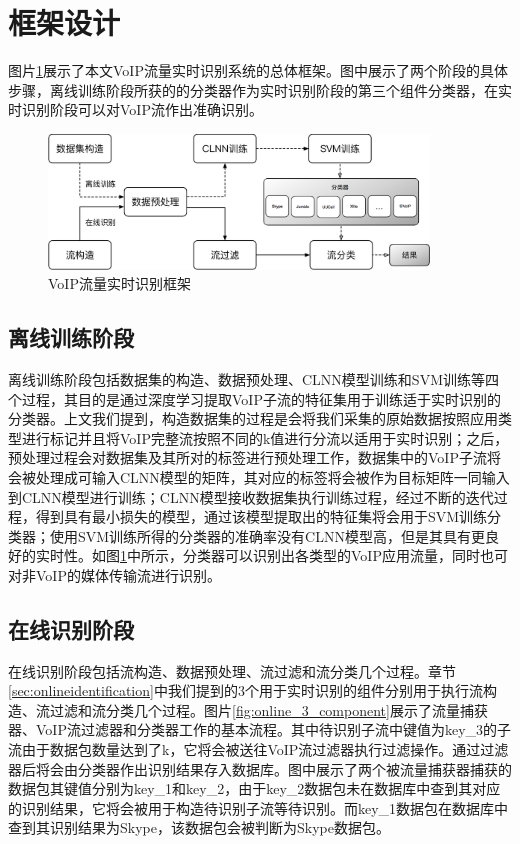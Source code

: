 \section{框架设计}
图片\ref{fig:architecture}展示了本文VoIP流量实时识别系统的总体框架。图中展示了两个阶段的具体步骤，离线训练阶段所获的的分类器作为实时识别阶段的第三个组件分类器，在实时识别阶段可以对VoIP流作出准确识别。
\begin{figure}[thb]
\centering
\includegraphics[width=0.9\textwidth]{figures/architecture.eps}
\caption{VoIP流量实时识别框架}
\label{fig:architecture}
\end{figure}

\subsection{离线训练阶段}
离线训练阶段包括数据集的构造、数据预处理、CLNN模型训练和SVM训练等四个过程，其目的是通过深度学习提取VoIP子流的特征集用于训练适于实时识别的分类器。上文我们提到，构造数据集的过程是会将我们采集的原始数据按照应用类型进行标记并且将VoIP完整流按照不同的k值进行分流以适用于实时识别；之后，预处理过程会对数据集及其所对的标签进行预处理工作，数据集中的VoIP子流将会被处理成可输入CLNN模型的矩阵，其对应的标签将会被作为目标矩阵一同输入到CLNN模型进行训练；CLNN模型接收数据集执行训练过程，经过不断的迭代过程，得到具有最小损失的模型，通过该模型提取出的特征集将会用于SVM训练分类器；使用SVM训练所得的分类器的准确率没有CLNN模型高，但是其具有更良好的实时性。如图\ref{fig:architecture}中所示，分类器可以识别出各类型的VoIP应用流量，同时也可对非VoIP的媒体传输流进行识别。

\subsection{在线识别阶段}
在线识别阶段包括流构造、数据预处理、流过滤和流分类几个过程。章节\ref{sec:onlineidentification}中我们提到的3个用于实时识别的组件分别用于执行流构造、流过滤和流分类几个过程。图片\ref{fig:online_3_component}展示了流量捕获器、VoIP流过滤器和分类器工作的基本流程。其中待识别子流中键值为key\_3的子流由于数据包数量达到了k，它将会被送往VoIP流过滤器执行过滤操作。通过过滤器后将会由分类器作出识别结果存入数据库。图中展示了两个被流量捕获器捕获的数据包其键值分别为key\_1和key\_2，由于key\_2数据包未在数据库中查到其对应的识别结果，它将会被用于构造待识别子流等待识别。而key\_1数据包在数据库中查到其识别结果为Skype，该数据包会被判断为Skype数据包。

